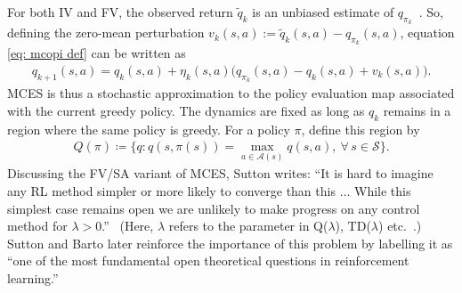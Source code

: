 \documentclass{article}
\begin{document}
For both IV and FV, the observed return $\tilde q_k$ is an unbiased estimate of $q_{\pi_k}$~\cite{Singh1996ReinforcementTraces}.
So, defining the zero-mean perturbation $v_k(s,a) := \tilde q_k(s,a) - q_{\pi_k}(s,a)$,
equation \eqref{eq: mcopi def} can be written as
\begin{align}
\label{eq: mcopi def noisy}
q_{k+1}(s,a) = q_k(s,a) + \eta_k(s,a) \big( q_{\pi_k}(s,a) - q_k(s,a) + v_k(s,a) \big) .
\end{align}
MCES is thus a stochastic approximation to the policy evaluation map associated with the current greedy policy.
The dynamics are fixed as long as $q_k$ remains in a region where the same policy is greedy. For a policy $\pi$, define this region by
\begin{align}
\label{eq: greedy action values}
    Q(\pi) \coloneqq \big\{ q  : q(s, \pi(s)) = \max_{a \in \mathcal A(s)} q(s,a), \ \forall \, s \in \mathcal S \big\} .
\end{align}
% 
% 
% 
Discussing the FV/SA variant of MCES,
Sutton
writes:
``It is hard to imagine any RL method simpler or
more likely to converge than this $\ldots$
While this simplest case remains open we
are unlikely to make progress on any control method for $\lambda > 0$.''~\cite[p.~13]{Sutton1999OpenLearning}
(Here, $\lambda$ refers to the parameter in Q($\lambda$), TD($\lambda$) etc.~\cite{Sutton1988LearningDifferences}.)
Sutton and Barto later reinforce the importance of this problem by labelling it as ``one of the most fundamental open theoretical questions in reinforcement learning.''~\cite[p.~99]{Sutton2018ReinforcementIntroduction}
\end{document}
